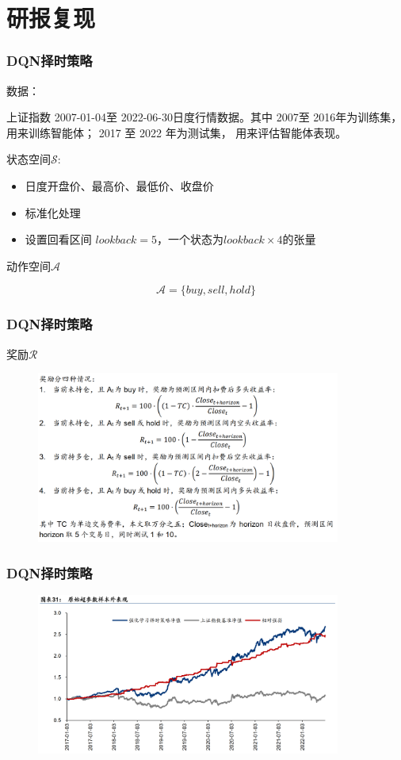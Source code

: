 \documentclass[9pt]{beamer}
\begin{document}
\section{研报复现}
\begin{frame}
\frametitle{DQN择时策略}

数据：

上证指数 2007-01-04至 2022-06-30日度行情数据。其中 2007至 2016年为训练集，用来训练智能体； 2017 至 2022 年为测试集， 用来评估智能体表现。

状态空间$\mathcal{S}$: 
\begin{itemize}
\item 日度开盘价、最高价、最低价、收盘价
\item 标准化处理
\item 设置回看区间 $lookback=5$，一个状态为$lookback\times 4$的张量
\end{itemize}

\vspace{1em}


动作空间$\mathcal{A}$

\[
\mathcal{A}=\{buy, sell, hold\}
\]

\end{frame}

\begin{frame}
\frametitle{DQN择时策略}

奖励$\mathcal{R}$

\begin{figure}
\centering
\includegraphics[width=10cm]{../fig/R.png}
\end{figure}

\end{frame}

\begin{frame}
\frametitle{DQN择时策略}
\begin{figure}
\centering
\includegraphics[width=10cm]{../fig/pnl.png}
\end{figure}
\end{frame}
\end{document}
